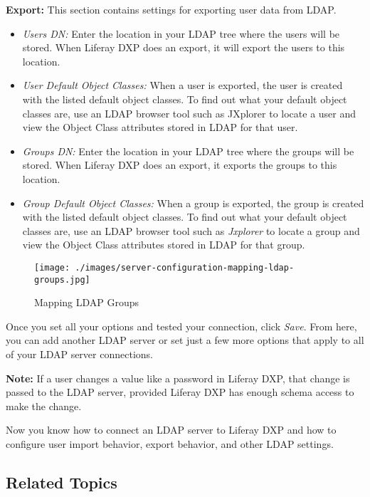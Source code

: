 \textbf{Export:} This section contains settings for exporting user data
from LDAP.

\begin{itemize}
\item
  \emph{Users DN:} Enter the location in your LDAP tree where the users
  will be stored. When Liferay DXP does an export, it will export the
  users to this location.
\item
  \emph{User Default Object Classes:} When a user is exported, the user
  is created with the listed default object classes. To find out what
  your default object classes are, use an LDAP browser tool such as
  JXplorer to locate a user and view the Object Class attributes stored
  in LDAP for that user.
\item
  \emph{Groups DN:} Enter the location in your LDAP tree where the
  groups will be stored. When Liferay DXP does an export, it exports the
  groups to this location.
\item
  \emph{Group Default Object Classes:} When a group is exported, the
  group is created with the listed default object classes. To find out
  what your default object classes are, use an LDAP browser tool such as
  \emph{Jxplorer} to locate a group and view the Object Class attributes
  stored in LDAP for that group.
\end{itemize}

\begin{figure}
\centering
\texttt{[image: ./images/server-configuration-mapping-ldap-groups.jpg]}
\caption{Mapping LDAP Groups}
\end{figure}

Once you set all your options and tested your connection, click
\emph{Save}. From here, you can add another LDAP server or set just a
few more options that apply to all of your LDAP server connections.

\noindent\hrulefill

\textbf{Note:} If a user changes a value like a password in Liferay DXP,
that change is passed to the LDAP server, provided Liferay DXP has
enough schema access to make the change.

\noindent\hrulefill

Now you know how to connect an LDAP server to Liferay DXP and how to
configure user import behavior, export behavior, and other LDAP
settings.

\subsection{Related Topics}\label{related-topics-6}

